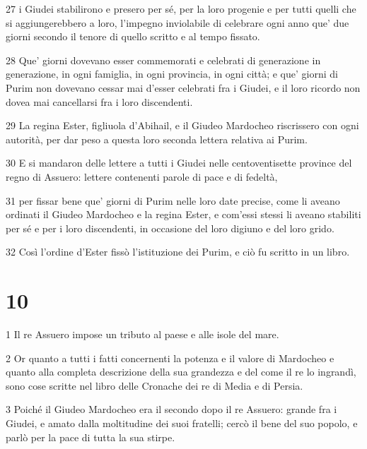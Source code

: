 \par 27 i Giudei stabilirono e presero per sé, per la loro progenie e per tutti quelli che si aggiungerebbero a loro, l'impegno inviolabile di celebrare ogni anno que' due giorni secondo il tenore di quello scritto e al tempo fissato.
\par 28 Que' giorni dovevano esser commemorati e celebrati di generazione in generazione, in ogni famiglia, in ogni provincia, in ogni città; e que' giorni di Purim non dovevano cessar mai d'esser celebrati fra i Giudei, e il loro ricordo non dovea mai cancellarsi fra i loro discendenti.
\par 29 La regina Ester, figliuola d'Abihail, e il Giudeo Mardocheo riscrissero con ogni autorità, per dar peso a questa loro seconda lettera relativa ai Purim.
\par 30 E si mandaron delle lettere a tutti i Giudei nelle centoventisette province del regno di Assuero: lettere contenenti parole di pace e di fedeltà,
\par 31 per fissar bene que' giorni di Purim nelle loro date precise, come li aveano ordinati il Giudeo Mardocheo e la regina Ester, e com'essi stessi li aveano stabiliti per sé e per i loro discendenti, in occasione del loro digiuno e del loro grido.
\par 32 Così l'ordine d'Ester fissò l'istituzione dei Purim, e ciò fu scritto in un libro.

\chapter{10}

\par 1 Il re Assuero impose un tributo al paese e alle isole del mare.
\par 2 Or quanto a tutti i fatti concernenti la potenza e il valore di Mardocheo e quanto alla completa descrizione della sua grandezza e del come il re lo ingrandì, sono cose scritte nel libro delle Cronache dei re di Media e di Persia.
\par 3 Poiché il Giudeo Mardocheo era il secondo dopo il re Assuero: grande fra i Giudei, e amato dalla moltitudine dei suoi fratelli; cercò il bene del suo popolo, e parlò per la pace di tutta la sua stirpe.


